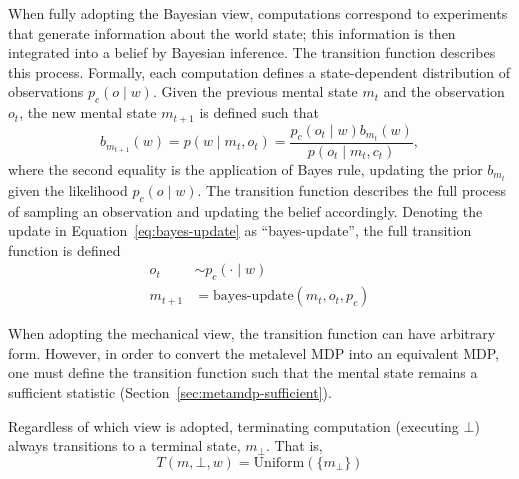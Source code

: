 When fully adopting the Bayesian view, computations correspond to experiments that generate information about the world state; this information is then integrated into a belief by Bayesian inference. The transition function describes this process. Formally, each computation defines a state-dependent distribution of observations $p_c(o \mid w)$. Given the previous mental state $m_t$ and the observation $o_t$, the new mental state $m_{t+1}$ is defined such that
%
\begin{equation}\label{eq:bayes-update}
  b_{m_{t+1}}(w) = p(w \mid m_t, o_t) = \frac{
    p_c(o_t \mid w) b_{m_t}(w) 
  }{
    p(o_t \mid m_t, c_t)
  },
\end{equation}
%
where the second equality is the application of Bayes rule, updating the prior $b_{m_t}$ given the likelihood $p_c(o \mid w)$. The transition function describes the full process of sampling an observation and updating the belief accordingly. Denoting the update in Equation~\ref{eq:bayes-update} as ``bayes-update'', the full transition function is defined
%
\begin{align}
  o_t &\sim p_c(\cdot \mid w) \\
  m_{t+1} &= \text{bayes-update}(m_t, o_t, p_c)
\end{align}

When adopting the mechanical view, the transition function can have arbitrary form. However, in order to convert the metalevel MDP into an equivalent MDP, one must define the transition function such that the mental state remains a sufficient statistic (Section~\ref{sec:metamdp-sufficient}).

Regardless of which view is adopted, terminating computation (executing $\bot$) always transitions to a terminal state, $m_\bot$. That is,
%
\begin{equation}
  T(m, \bot, w) = \text{Uniform}(\{m_\bot\})
\end{equation}
%



